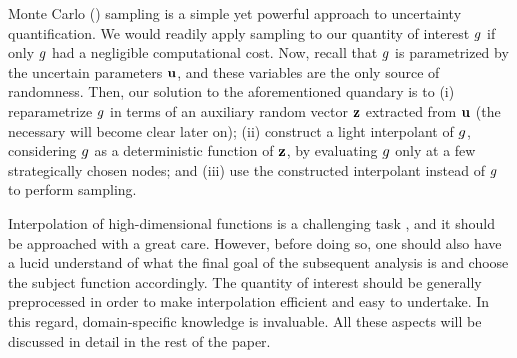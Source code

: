 Monte Carlo () sampling is a simple yet powerful approach to
uncertainty quantification. We would readily apply  sampling to our
quantity of interest $g$ if only $g$ had a negligible computational cost. Now,
recall that $g$ is parametrized by the uncertain parameters $\mathbf{u}$, and these
variables are the only source of randomness. Then, our solution to the
aforementioned quandary is to (i) reparametrize $g$ in terms of an auxiliary
random vector $\mathbf{z}$ extracted from $\mathbf{u}$ (the necessary will become clear later
on); (ii) construct a light interpolant of $g$, considering $g$ as a
deterministic function of $\mathbf{z}$, by evaluating $g$ only at a few strategically
chosen nodes; and (iii) use the constructed interpolant instead of $g$ to
perform  sampling.

Interpolation of high-dimensional functions is a challenging task \perse, and it
should be approached with a great care. However, before doing so, one should
also have a lucid understand of what the final goal of the subsequent analysis
is and choose the subject function accordingly. The quantity of interest should
be generally preprocessed in order to make interpolation efficient and easy to
undertake. In this regard, domain-specific knowledge is invaluable. All these
aspects will be discussed in detail in the rest of the paper.
